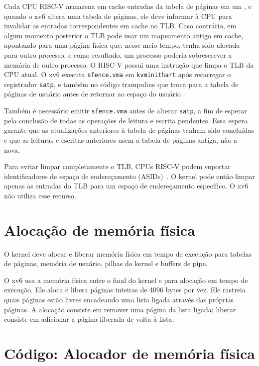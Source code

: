 Cada CPU RISC-V armazena em cache entradas da tabela de páginas em um
, e quando o xv6 altera
uma tabela de páginas, ele deve informar à CPU para invalidar as entradas
correspondentes em cache no TLB. Caso contrário,
em algum momento posterior o TLB pode
usar um mapeamento antigo em cache, apontando para uma página física que, nesse meio tempo,
tenha sido alocada para outro processo, e como resultado, um processo
poderia sobrescrever a memória de outro processo. O RISC-V
possui uma instrução  que limpa
o TLB da CPU atual.
O xv6 executa {\tt sfence.vma} em {\tt kvminithart} após recarregar o 
registrador \texttt{satp}, e também no código trampoline que
troca para a tabela de páginas de usuário antes de retornar ao espaço do usuário
.

Também é necessário emitir \texttt{sfence.vma} antes de alterar
\texttt{satp}, a fim de esperar pela conclusão de todas as operações de leitura e
escrita pendentes. Essa espera garante que as atualizações anteriores à tabela de páginas tenham
sido concluídas e que as leituras e escritas anteriores usem a tabela de páginas antiga,
não a nova.

Para evitar limpar completamente o TLB, CPUs RISC-V podem suportar
identificadores de espaço de endereçamento (ASIDs)~\cite{riscv:priv}. O kernel pode então
limpar apenas as entradas do TLB para um espaço de endereçamento específico. O xv6
não utiliza esse recurso.

\section{Alocação de memória física}

O kernel deve alocar e liberar memória física em tempo de execução para
tabelas de páginas,
memória de usuário,
pilhas do kernel
e buffers de pipe.

O xv6 usa a memória física entre o final do kernel e
para alocação em tempo de execução. Ele aloca e libera páginas inteiras de 4096 bytes
por vez. Ele rastreia quais páginas estão livres encadeando uma
lista ligada através das próprias páginas. A alocação consiste em
remover uma página da lista ligada; liberar consiste em adicionar a
página liberada de volta à lista.

\section{Código: Alocador de memória física}

